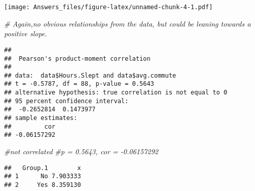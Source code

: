 \documentclass[
]{article}
\newenvironment{Shaded}{\begin{snugshade}}{\end{snugshade}}
\newcommand{\AttributeTok}[1]{\textcolor[rgb]{0.13,0.29,0.53}{#1}}
\newcommand{\CommentTok}[1]{\textcolor[rgb]{0.56,0.35,0.01}{\textit{#1}}}
\newcommand{\FunctionTok}[1]{\textcolor[rgb]{0.13,0.29,0.53}{\textbf{#1}}}
\newcommand{\NormalTok}[1]{#1}
\newcommand{\SpecialCharTok}[1]{\textcolor[rgb]{0.81,0.36,0.00}{\textbf{#1}}}
\begin{document}
\texttt{[image: Answers\_files/figure-latex/unnamed-chunk-4-1.pdf]}

\begin{Shaded}
\begin{Highlighting}[]
\CommentTok{\# Again,no obvious relationships from the data, but could be leaning towards a positive slope.}
\end{Highlighting}
\end{Shaded}

\begin{Shaded}
\end{Shaded}

\begin{verbatim}
## 
##  Pearson's product-moment correlation
## 
## data:  data$Hours.Slept and data$avg.commute
## t = -0.5787, df = 88, p-value = 0.5643
## alternative hypothesis: true correlation is not equal to 0
## 95 percent confidence interval:
##  -0.2652814  0.1473977
## sample estimates:
##         cor 
## -0.06157292
\end{verbatim}

\begin{Shaded}
\begin{Highlighting}[]
\CommentTok{\#not correlated}
\CommentTok{\#p = 0.5643, cor = {-}0.06157292 }
\end{Highlighting}
\end{Shaded}

\begin{Shaded}
\end{Shaded}

\begin{verbatim}
##   Group.1        x
## 1      No 7.903333
## 2     Yes 8.359130
\end{verbatim}
\end{document}
